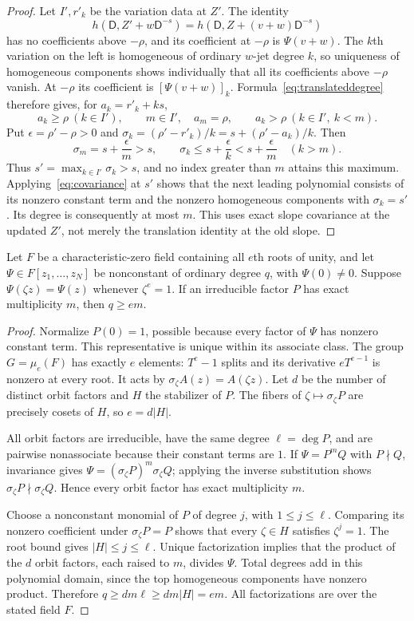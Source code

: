 \documentclass{article}
\newcommand{\DD}{\mathsf D}
\begin{document}
\begin{proof}
Let $I',r'_k$ be the variation data at $Z'$. The identity
\[
 h(\DD,Z'+w\DD^{-s})=h(\DD,Z+(v+w)\DD^{-s})
\]
has no coefficients above $-\rho$, and its coefficient at $-\rho$ is $\Psi(v+w)$. The $k$th variation on the left is homogeneous of ordinary $w$-jet degree $k$, so uniqueness of homogeneous components shows individually that all its coefficients above $-\rho$ vanish. At $-\rho$ its coefficient is $[\Psi(v+w)]_k$. Formula~\eqref{eq:translateddegree} therefore gives, for $a_k=r'_k+ks$,
\[
 a_k\geq\rho\ (k\in I'),\qquad m\in I',\quad a_m=\rho,
 \qquad a_k>\rho\ (k\in I',\ k<m).
\]
Put $\epsilon=\rho'-\rho>0$ and
$\sigma_k=(\rho'-r'_k)/k=s+(\rho'-a_k)/k$. Then
\[
 \sigma_m=s+\frac\epsilon m>s,
 \qquad
 \sigma_k\leq s+\frac\epsilon k<s+\frac\epsilon m
 \quad(k>m).
\]
Thus $s'=\max_{k\in I'}\sigma_k>s$, and no index greater than $m$ attains this maximum. Applying~\eqref{eq:covariance} at $s'$ shows that the next leading polynomial consists of its nonzero constant term and the nonzero homogeneous components with $\sigma_k=s'$. Its degree is consequently at most $m$. This uses exact slope covariance at the updated $Z'$, not merely the translation identity at the old slope.
\end{proof}

\begin{lemma}\label{lem:orbit}
Let $F$ be a characteristic-zero field containing all $e$th roots of unity, and let $\Psi\in F[z_1,\ldots,z_N]$ be nonconstant of ordinary degree $q$, with $\Psi(0)\ne0$. Suppose $\Psi(\zeta z)=\Psi(z)$ whenever $\zeta^e=1$. If an irreducible factor $P$ has exact multiplicity $m$, then $q\geq em$.
\end{lemma}
\begin{proof}
Normalize $P(0)=1$, possible because every factor of $\Psi$ has nonzero constant term. This representative is unique within its associate class. The group $G=\mu_e(F)$ has exactly $e$ elements: $T^e-1$ splits and its derivative $eT^{e-1}$ is nonzero at every root. It acts by $\sigma_\zeta A(z)=A(\zeta z)$. Let $d$ be the number of distinct orbit factors and $H$ the stabilizer of $P$. The fibers of $\zeta\mapsto\sigma_\zeta P$ are precisely cosets of $H$, so $e=d|H|$.

All orbit factors are irreducible, have the same degree $\ell=\deg P$, and are pairwise nonassociate because their constant terms are $1$. If $\Psi=P^mQ$ with $P\nmid Q$, invariance gives $\Psi=(\sigma_\zeta P)^m\sigma_\zeta Q$; applying the inverse substitution shows $\sigma_\zeta P\nmid\sigma_\zeta Q$. Hence every orbit factor has exact multiplicity $m$.

Choose a nonconstant monomial of $P$ of degree $j$, with $1\leq j\leq\ell$. Comparing its nonzero coefficient under $\sigma_\zeta P=P$ shows that every $\zeta\in H$ satisfies $\zeta^j=1$. The root bound gives $|H|\leq j\leq\ell$. Unique factorization implies that the product of the $d$ orbit factors, each raised to $m$, divides $\Psi$. Total degrees add in this polynomial domain, since the top homogeneous components have nonzero product. Therefore $q\geq dm\ell\geq dm|H|=em$. All factorizations are over the stated field $F$.
\end{proof}
\end{document}
